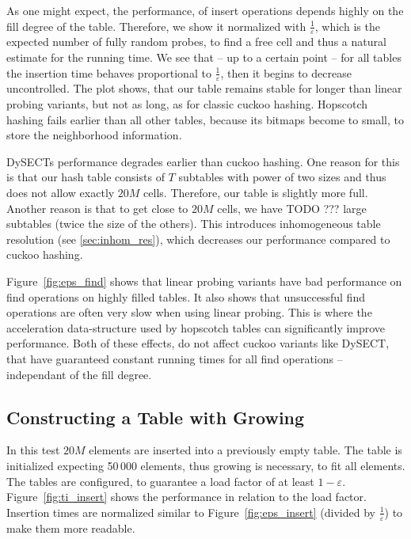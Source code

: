 \documentclass[a4paper,UKenglish]{lipics-v2016}
\begin{document}
As one might expect, the performance, of insert operations depends
highly on the fill degree of the table.  Therefore, we show it
normalized with $\frac{1}{\varepsilon}$, which is the expected number
of fully random probes, to find a free cell and thus a natural
estimate for the running time. We see that -- up to a certain point --
for all tables the insertion time behaves proportional to
$\frac{1}{\varepsilon}$, then it begins to decrease uncontrolled.  The
plot shows, that our table remains stable for longer than linear
probing variants, but not as long, as for classic cuckoo hashing.
Hopscotch hashing fails earlier than all other tables, because its
bitmaps become to small, to store the neighborhood information.

DySECTs performance degrades earlier than cuckoo hashing.  One reason
for this is that our hash table consists of $T$ subtables with power
of two sizes and thus does not allow exactly $20M$ cells.  Therefore,
our table is slightly more full.  Another reason is that to get close
to $20M$ cells, we have TODO ??? large subtables (twice the size of
the others).  This introduces inhomogeneous table resolution (see
\ref{sec:inhom_res}), which decreases our performance compared to
cuckoo hashing.

Figure~\ref{fig:eps_find} shows that linear probing variants have bad
performance on find operations on highly filled tables.  It also shows
that unsuccessful find operations are often very slow when using
linear probing.  This is where the acceleration data-structure used by
hopscotch tables can significantly improve performance.  Both of these
effects, do not affect cuckoo variants like DySECT, that have
guaranteed constant running times for all find operations --
independant of the fill degree.

\subsection{Constructing a Table with Growing}
\label{sec:exp_ti}
In this test $20M$ elements are inserted into a previously empty
table.  The table is initialized expecting 50\,000 elements, thus
growing is necessary, to fit all elements.  The tables are configured,
to guarantee a load factor of at least
$1-\varepsilon$. Figure~\ref{fig:ti_insert} shows the performance in
relation to the load factor.  Insertion times are normalized similar to
Figure~\ref{fig:eps_insert} (divided by $\frac{1}{\varepsilon}$) to
make them more readable.
\end{document}
